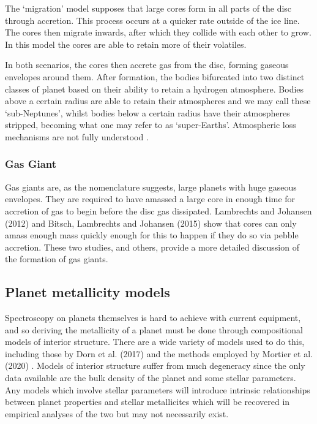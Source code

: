 \documentclass[a4paper,twocolumn,12pt]{article}
\begin{document}
The `migration' model supposes that large cores form in all parts of the disc through accretion. This process occurs at a quicker rate outside of the ice line. The cores then migrate inwards, after which they collide with each other to grow. In this model the cores are able to retain more of their volatiles.

In both scenarios, the cores then accrete gas from the disc, forming gaseous envelopes around them. After formation, the bodies bifurcated into two distinct classes of planet based on their ability to retain a hydrogen atmosphere. Bodies above a certain radius are able to retain their atmospheres and we may call these `sub-Neptunes', whilst bodies below a certain radius have their atmospheres stripped, becoming what one may refer to as `super-Earths'. Atmospheric loss mechanisms are not fully understood \cite{NatureAndOriginOfSubNeptunesGoodPaper}.

\subsubsection{Gas Giant}
Gas giants are, as the nomenclature suggests, large planets with huge gaseous envelopes. They are required to have amassed a large core in enough time for accretion of gas to begin before the disc gas dissipated. Lambrechts and Johansen (2012)\cite{L-J-2012} and Bitsch, Lambrechts and Johansen (2015)\cite{BitschPebbleAccretion2015} show that cores can only amass enough mass quickly enough for this to happen if they do so via pebble accretion. These two studies, and others, provide a more detailed discussion of the formation of gas giants.

\subsection{Planet metallicity models}
\label{subsection: Planet Metallicity Models}
\vspace{-0.3em}
Spectroscopy on planets themselves is hard to achieve with current equipment, and so deriving the metallicity of a planet must be done through compositional models of interior structure. There are a wide variety of models used to do this, including those by Dorn et al. (2017) \cite{SussyInteriorModelsSuper-EarthsAndSub-Neptunes} and the methods employed by Mortier et al. (2020) \cite{MortierInteriorStructure}. Models of interior structure suffer from much degeneracy since the only data available are the bulk density of the planet and some stellar parameters. Any models which involve stellar parameters will introduce intrinsic relationships between planet properties and stellar metallicites which will be recovered in empirical analyses of the two but may not necessarily exist.
\end{document}
